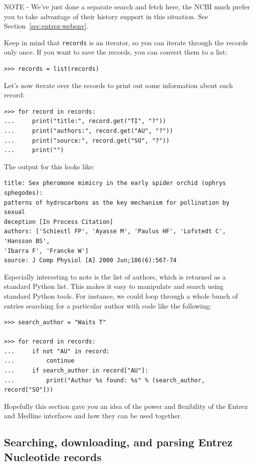 \documentclass{report}
\begin{document}
NOTE - We've just done a separate search and fetch here, the NCBI much prefer you to take advantage of their history support in this situation.  See Section~\ref{sec:entrez-webenv}.

Keep in mind that \verb+records+ is an iterator, so you can iterate through the records only once. If you want to save the records, you can convert them to a list:
\begin{verbatim}
>>> records = list(records)
\end{verbatim}

Let's now iterate over the records to print out some information about each record:
\begin{verbatim}
>>> for record in records:
...     print("title:", record.get("TI", "?"))
...     print("authors:", record.get("AU", "?"))
...     print("source:", record.get("SO", "?"))
...     print("")
\end{verbatim}

The output for this looks like:
\begin{verbatim}
title: Sex pheromone mimicry in the early spider orchid (ophrys sphegodes):
patterns of hydrocarbons as the key mechanism for pollination by sexual
deception [In Process Citation]
authors: ['Schiestl FP', 'Ayasse M', 'Paulus HF', 'Lofstedt C', 'Hansson BS',
'Ibarra F', 'Francke W']
source: J Comp Physiol [A] 2000 Jun;186(6):567-74
\end{verbatim}

Especially interesting to note is the list of authors, which is returned as a standard Python list. This makes it easy to manipulate and search using standard Python tools. For instance, we could loop through a whole bunch of entries searching for a particular author with code like the following:
\begin{verbatim}
>>> search_author = "Waits T"

>>> for record in records:
...     if not "AU" in record:
...         continue
...     if search_author in record["AU"]:
...         print("Author %s found: %s" % (search_author, record["SO"]))
\end{verbatim}

Hopefully this section gave you an idea of the power and flexibility of the Entrez and Medline interfaces and how they can be used together.

\subsection{Searching, downloading, and parsing Entrez Nucleotide records}
\label{subsec:entrez_example_genbank}
\end{document}
